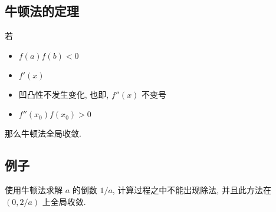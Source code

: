 \subsection{牛顿法的定理}

\begin{frame}
\begin{thm}
若
	\begin{itemize}
	\item \(f (a ) f(b) < 0\)
	\item \(f '(x) \)
	\item 凹凸性不发生变化, 也即, \(f ''(x)\) 不变号
	\item \(f ''(x_{0}) f (x _{0}) > 0\)
	\end{itemize}
	那么牛顿法全局收敛.
\end{thm}
\end{frame}

\subsection{例子}
\begin{frame}
使用牛顿法求解 \(a\) 的倒数 \(1/a\), 计算过程之中不能出现除法, 并且此方法在 \((0, 2/a)\) 上全局收敛.
\end{frame}
